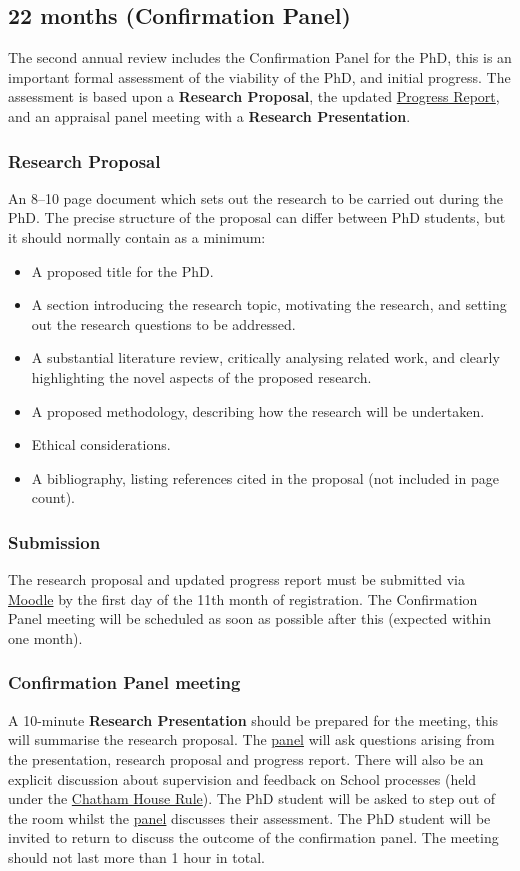 \documentclass[12pt,a4paper]{article}
\begin{document}
\subsection{22 months (Confirmation Panel)} \label{sec:22months}
The second annual review includes the Confirmation Panel for the PhD, this is an important formal assessment of the viability of the PhD, and initial progress. The assessment is based upon a \textbf{Research Proposal}, the updated \hyperref[sec:report]{Progress Report}, and an appraisal panel meeting with a \textbf{Research Presentation}.

\subsubsection{Research Proposal}
An 8--10 page document which sets out the research to be carried out during the PhD. The precise structure of the proposal can differ between PhD students, but it should normally contain as a minimum:
\begin{itemize}
	\item A proposed title for the PhD.
	\item A section introducing the research topic, motivating the research, and setting out the research questions to be addressed.
	\item A substantial literature review, critically analysing related work, and clearly highlighting the novel aspects of the proposed research.
	\item A proposed methodology, describing how the research will be undertaken.
	\item Ethical considerations.
	\item A bibliography, listing references cited in the proposal (not included in page count).
\end{itemize}

\subsubsection{Submission}
The research proposal and updated progress report must be submitted via \href{https://modules.lancaster.ac.uk/course/view.php?id=7050}{Moodle} by the first day of the 11th month of registration. The Confirmation Panel meeting will be scheduled as soon as possible after this (expected within one month).

\subsubsection{Confirmation Panel meeting}
A 10-minute \textbf{Research Presentation} should be prepared for the meeting, this will summarise the research proposal. The \hyperref[sec:panel]{panel} will ask questions arising from the presentation, research proposal and progress report. There will also be an explicit discussion about supervision and feedback on School processes (held under the \href{https://www.chathamhouse.org/chatham-house-rule}{Chatham House Rule}). The PhD student will be asked to step out of the room whilst the \hyperref[sec:panel]{panel} discusses their assessment. The PhD student will be invited to return to discuss the outcome of the confirmation panel. The meeting should not last more than 1 hour in total.
\end{document}

